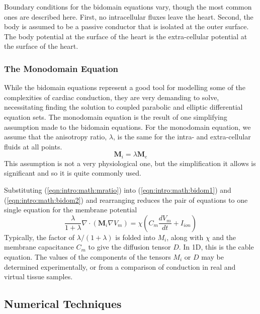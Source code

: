 Boundary conditions for the bidomain equations vary, though the most common ones are described here.
First, no intracellular fluxes leave the heart.
Second, the body is assumed to be a passive conductor that is isolated at the outer surface.
The body potential at the surface of the heart is the extra-cellular potential at the surface of the heart.

\subsubsection{The Monodomain Equation}
\label{sec:intro:math:mono}

While the bidomain equations represent a good tool for modelling some of the complexities of cardiac conduction, they are very demanding to solve, necessitating finding the solution to coupled parabolic and elliptic differential equation sets.
The monodomain equation is the result of one simplifying assumption made to the bidomain equations.
For the monodomain equation, we assume that the anisotropy ratio, $\lambda$, is the same for the intra- and extra-cellular fluids at all points.
\begin{equation}
\mathbf{M}_{i} = {\lambda}\mathbf{M}_{e}
\label{eqn:intro:math:mratio}
\end{equation}
This assumption is not a very physiological one, but the simplification it
allows is significant and so it is quite commonly used.

Substituting (\ref{eqn:intro:math:mratio}) into (\ref{eqn:intro:math:bidom1})
and (\ref{eqn:intro:math:bidom2}) and rearranging reduces the pair of equations
to one single equation for the membrane potential
\begin{equation}
\frac{\lambda}{1+\lambda}\nabla\cdot\left(\mathbf{M}_{i}\nabla V_{m}\right) = \chi \left( C_{m}\frac{dV_{m}}{dt} + I_{ion}\right)
\label{eqn:intro:math:mono}
\end{equation}
Typically, the factor of ${\lambda}/\left({1+\lambda}\right)$ is folded into
$M_{i}$, along with $\chi$ and the membrane capacitance $C_m$ to give the diffusion tensor $D$.
In 1D, this is the cable equation.
The values of the components of the tensors $M_{i}$ or $D$ may be determined experimentally, or from a comparison of conduction in real and virtual tissue samples.

\subsection{Numerical Techniques}

